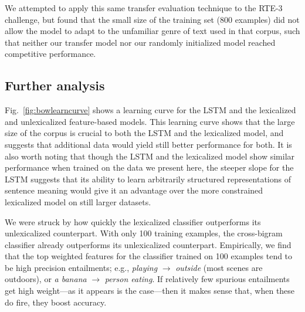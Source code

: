 
We attempted to apply this same transfer evaluation technique to the RTE-3 challenge, but found that the small size of the training set (800 examples) did not allow the model to adapt to the unfamiliar genre of text used in that corpus, such that neither our transfer model nor our randomly initialized model reached competitive performance.

\subsection{Further analysis}

Fig.~\ref{fig:bowlearncurve} shows a learning curve for the LSTM and the lexicalized and unlexicalized feature-based models. This learning curve shows that the large size of the corpus is crucial to both the LSTM and the lexicalized model, and suggests that additional data would yield still better performance for both. It is also worth noting that though the LSTM and the lexicalized model show similar performance when trained on the data we present here, the steeper slope for the LSTM suggests that its ability to learn arbitrarily structured representations of sentence meaning would give it an advantage over the more constrained lexicalized model on still larger datasets.



We were struck by how quickly the lexicalized classifier outperforms its unlexicalized counterpart.
With only 100 training examples, the cross-bigram classifier already outperforms its unlexicalized counterpart.
Empirically, we find that the top weighted features for the classifier
  trained on 100 examples tend to be high precision entailments;
  e.g.,
  \textit{playing} $\rightarrow$ \textit{outside}
  (most scenes are outdoors), or \textit{a banana} $\rightarrow$
  \textit{person eating}.
If relatively few spurious entailments get high weight---as it appears
is the case---then it makes sense that, when these do fire, they
boost accuracy.
  

